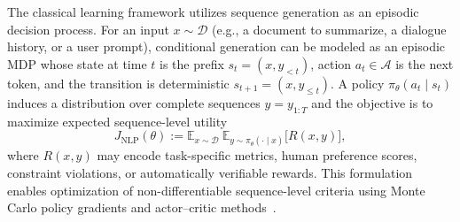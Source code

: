 \documentclass{article}
\numberwithin{equation}{section}
\newcommand{\E}{\mathbb E}
\newcommand{\cD}{\mathcal{D}}
\begin{document}
The classical learning framework utilizes sequence generation as an episodic decision process. For an input $x\sim\cD$ (e.g., a document to summarize, a dialogue history, or a user prompt), conditional generation can be modeled as an episodic MDP whose state at time $t$ is the prefix $s_t=(x,y_{<t})$, action $a_t\in\mathcal{A}$ is the next token, and the transition is deterministic $s_{t+1}=(x,y_{\le t})$. A policy $\pi_\theta(a_t\mid s_t)$ induces a distribution over complete sequences $y=y_{1:T}$ and the objective is to maximize expected sequence-level utility
\begin{equation}\label{eq:nlp_seq_rl_objective}
J_{\mathrm{NLP}}(\theta):=\E_{x\sim\cD}\ \E_{y\sim\pi_\theta(\cdot\mid x)}\!\big[R(x,y)\big],
\end{equation}
where $R(x,y)$ may encode task-specific metrics, human preference scores, constraint violations, or automatically verifiable rewards. This formulation enables optimization of non-differentiable sequence-level criteria using Monte Carlo policy gradients and actor--critic methods~\cite{williams1992reinforce,peters2008policygrad}.
\end{document}
